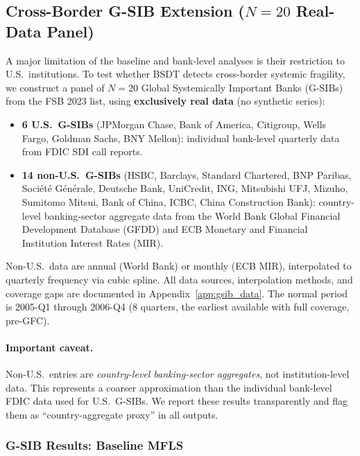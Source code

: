 \documentclass[11pt]{article}
\theoremstyle{definition}
\begin{document}
\subsection{Cross-Border G-SIB Extension ($N=20$ Real-Data Panel)}
\label{sec:gsib}

A major limitation of the baseline and bank-level analyses is their restriction
to U.S.\ institutions.  To test whether BSDT detects cross-border systemic
fragility, we construct a panel of $N=20$ Global Systemically Important Banks
(G-SIBs) from the FSB 2023 list, using \textbf{exclusively real data}
(no synthetic series):

\begin{itemize}
  \item \textbf{6 U.S.\ G-SIBs} (JPMorgan Chase, Bank of America, Citigroup,
    Wells Fargo, Goldman Sachs, BNY Mellon): individual bank-level quarterly
    data from FDIC SDI call reports.
  \item \textbf{14 non-U.S.\ G-SIBs} (HSBC, Barclays, Standard Chartered,
    BNP Paribas, Soci\'et\'e G\'en\'erale, Deutsche Bank, UniCredit, ING,
    Mitsubishi UFJ, Mizuho, Sumitomo Mitsui, Bank of China, ICBC,
    China Construction Bank): country-level banking-sector aggregate data
    from the World Bank Global Financial Development Database (GFDD)
    and ECB Monetary and Financial Institution Interest Rates (MIR).
\end{itemize}

\noindent Non-U.S.\ data are annual (World Bank) or monthly (ECB MIR),
interpolated to quarterly frequency via cubic spline.  All data sources,
interpolation methods, and coverage gaps are documented in
Appendix~\ref{app:gsib_data}.  The normal period is 2005-Q1 through
2006-Q4 (8 quarters, the earliest available with full coverage, pre-GFC).

\paragraph{Important caveat.}
Non-U.S.\ entries are \emph{country-level banking-sector aggregates},
not institution-level data.  This represents a coarser approximation than
the individual bank-level FDIC data used for U.S.\ G-SIBs.  We report
these results transparently and flag them as ``country-aggregate proxy'' in
all outputs.

\subsubsection{G-SIB Results: Baseline MFLS}
\end{document}

